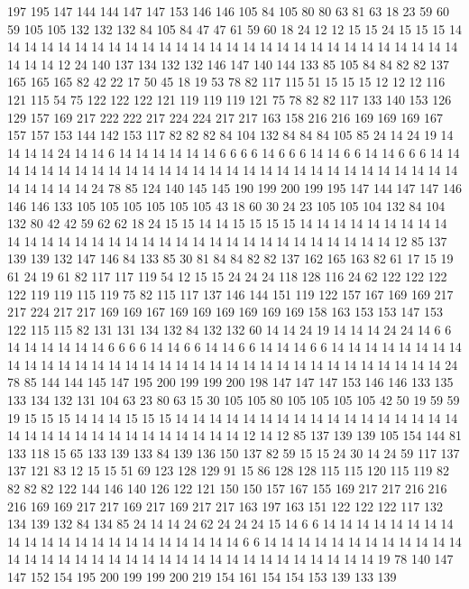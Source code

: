 197 195 147 144 144 147 147 153 146 146 105 84 105 80 80 63 81 63 18 23
59 60 59 105 105 132 132 132 84 105 84 47 47 61 59 60 18 24 12 12
15 15 24 15 15 15 14 14 14 14 14 14 14 14 14 14 14 14 14 14
14 14 14 14 14 14 14 14 14 14 14 14 14 14 14 14 14 12 24 140
137 134 132 132 146 147 140 144 133 85 105 84 84 82 82 137 165 165 165 82
42 22 17 50 45 18 19 53 78 82 117 115 51 15 15 15 12 12 12 116
121 115 54 75 122 122 122 121 119 119 119 121 75 78 82 82 117 133 140 153
126 129 157 169 217 222 222 217 224 224 217 217 163 158 216 216 169 169 169 167
157 157 153 144 142 153 117 82 82 82 84 104 132 84 84 84 105 85 24 14
24 19 14 14 14 14 24 14 14 6 14 14 14 14 14 14 6 6 6 6
14 6 6 6 14 14 6 6 14 14 6 6 6 14 14 14 14 14 14 14
14 14 14 14 14 14 14 14 14 14 14 14 14 14 14 14 14 14 14 14
14 14 14 14 14 14 14 24 78 85 124 140 145 145 190 199 200 199 195 147
144 147 147 146 146 146 133 105 105 105 105 105 105 43 18 60 30 24 23 105
105 104 132 84 104 132 80 42 42 59 62 62 18 24 15 15 14 14 15 15
15 15 14 14 14 14 14 14 14 14 14 14 14 14 14 14 14 14 14 14
14 14 14 14 14 14 14 14 14 14 14 14 14 14 12 85 137 139 139 132
147 146 84 133 85 30 81 84 84 82 82 137 162 165 163 82 61 17 15 19
61 24 19 61 82 117 117 119 54 12 15 15 24 24 24 118 128 116 24 62
122 122 122 122 119 119 115 119 75 82 115 117 137 146 144 151 119 122 157 167
169 169 217 217 224 217 217 169 169 167 169 169 169 169 169 169 158 163 153 153
147 153 122 115 115 82 131 131 134 132 84 132 132 60 14 14 24 19 14 14
14 24 24 14 6 6 14 14 14 14 14 14 6 6 6 6 14 14 6 6
14 14 6 6 14 14 14 6 6 14 14 14 14 14 14 14 14 14 14 14
14 14 14 14 14 14 14 14 14 14 14 14 14 14 14 14 14 14 14 14
14 14 14 24 78 85 144 144 145 147 195 200 199 199 200 198 147 147 147 153
146 146 133 135 133 134 132 131 104 63 23 80 63 15 30 105 105 80 105 105
105 105 42 50 19 59 59 19 15 15 15 14 14 14 15 15 15 14 14 14
14 14 14 14 14 14 14 14 14 14 14 14 14 14 14 14 14 14 14 14
14 14 14 14 14 14 14 14 12 14 12 85 137 139 139 105 154 144 81 133
118 15 65 133 139 133 84 139 136 150 137 82 59 15 15 24 30 14 24 59
117 137 137 121 83 12 15 15 51 69 123 128 129 91 15 86 128 128 115 115
120 115 119 82 82 82 82 122 144 146 140 126 122 121 150 150 157 167 155 169
217 217 216 216 216 169 169 217 217 169 217 169 217 217 163 197 163 151 122 122
122 117 132 134 139 132 84 134 85 24 14 14 24 62 24 24 24 15 14 6
6 14 14 14 14 14 14 14 14 14 14 14 14 14 14 14 14 14 14 14
14 14 14 6 6 14 14 14 14 14 14 14 14 14 14 14 14 14 14 14
14 14 14 14 14 14 14 14 14 14 14 14 14 14 14 14 14 14 14 19
78 140 147 147 152 154 195 200 199 199 200 219 154 161 154 154 153 139 133 139
